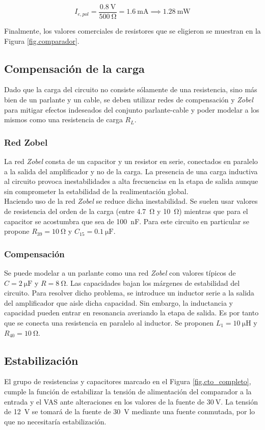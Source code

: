 	\begin{equation}
		I_{e,pol} = \frac{ \SI{0.8}{\volt} }{ \SI{500}{\ohm} } = \SI{1.6}{\milli\ampere} \implies \SI{1.28}{\milli\watt}
	\end{equation}

Finalmente, los valores comerciales de resistores que se eligieron se muestran en la Figura \ref{fig.comparador}.	
	\subsection{Compensación de la carga}
		Dado que la carga del circuito no consiste sólamente de una resistencia, sino más bien de un parlante y un cable, se deben utilizar redes de compensación y \emph{Zobel} para mitigar efectos indeseados del conjunto parlante-cable y poder modelar a los mismos como una resistencia de carga $R_L$.
		\subsubsection{Red Zobel}
			La red \emph{Zobel} consta de un capacitor y un resistor en serie, conectados en paralelo a la salida del amplificador y no de la carga. La presencia de una carga inductiva al circuito provoca inestabilidades a alta frecuencias en la etapa de salida aunque sin comprometer la estabilidad	de la realimentación global.\\
			\indent Haciendo uso de la red \emph{Zobel} se reduce dicha inestabilidad. Se suelen usar valores de resistencia del orden de la carga (entre \SI{4.7}{\ohm} y \SI{10}{\ohm}) mientras que para el capacitor se acostumbra que sea de \SI{100}{\nano\F}. Para este circuito en particular se propone $R_{39}=\SI{10}{\ohm}$ y $C_{15}=\SI{0.1}{\micro\F}$.
		
		\subsubsection{Compensación}
		Se puede modelar a un parlante como una red \emph{Zobel} con valores típicos de $C=\SI{2}{\micro\F}$ y $R=\SI{8}{\ohm}$. Las capacidades bajan los márgenes de estabilidad del circuito. Para resolver dicho problema, se introduce un inductor serie a la salida del amplificador que aisle dicha capacidad. Sin embargo, la inductancia y capacidad pueden entrar en resonancia averiando la etapa de salida. Es por tanto que se conecta una resistencia en paralelo al inductor. Se proponen $L_1 = \SI{10}{\micro\henry}$ y $R_{40}=\SI{10}{\ohm}$.
	\subsection{Estabilización}

	El grupo de resistencias y capacitores marcado en el Figura \ref{fig.cto_completo}, cumple la función de estabilizar la tensión de alimentación del comparador a la entrada y el VAS ante alteraciones en los valores de la fuente de $\SI{30}{\volt}$. La tensión de \SI{12}{\volt} se tomará de la fuente de \SI{30}{\volt} mediante una fuente conmutada, por lo que no necesitaría estabilización.


